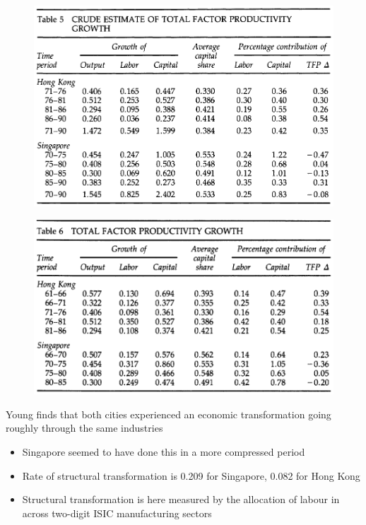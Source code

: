 \documentclass{beamer}
\begin{document}
\begin{frame}
  \begin{figure}
    \includegraphics[scale=.8]{young.eps}
  \end{figure}
\end{frame}

\begin{frame}
  \begin{figure}
    \includegraphics[scale=.8]{young2.eps}
  \end{figure}
\end{frame}

\begin{frame}
  Young finds that both cities experienced an economic transformation going roughly through the same industries
  \begin{itemize}
    \item Singapore seemed to have done this in a more compressed period
    \item Rate of structural transformation is 0.209 for Singapore, 0.082 for Hong Kong
    \item Structural transformation is here measured by the allocation of labour in across two-digit ISIC manufacturing sectors
  \end{itemize}  
\end{frame}
\end{document}
